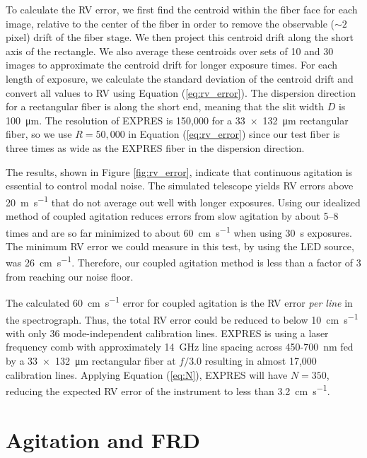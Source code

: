 To calculate the RV error, we first find the centroid within the fiber face for each image, relative to the center of the fiber in order to remove the observable ($\sim 2$ pixel) drift of the fiber stage. We then project this centroid drift along the short axis of the rectangle. We also average these centroids over sets of 10 and 30 images to approximate the centroid drift for longer exposure times. For each length of exposure, we calculate the standard deviation of the centroid drift and convert all values to RV using Equation (\ref{eq:rv_error}). The dispersion direction for a rectangular fiber is along the short end, meaning that the slit width $D$ is \SI{100}{\micro\meter}. The resolution of EXPRES is 150,000 for a \SI{33x132}{\micro\meter} rectangular fiber, so we use $R=50,000$ in Equation (\ref{eq:rv_error}) since our test fiber is three times as wide as the EXPRES fiber in the dispersion direction.

The results, shown in Figure \ref{fig:rv_error}, indicate that continuous agitation is essential to control modal noise. The simulated telescope yields RV errors above \SI{20}{\meter\per\second} that do not average out well with longer exposures. Using our idealized method of coupled agitation reduces errors from slow agitation by about 5--8 times and are so far minimized to about \SI{60}{\centi\meter\per\second} when using \SI{30}{\second} exposures. The minimum RV error we could measure in this test, by using the LED source, was \SI{26}{\centi\meter\per\second}. Therefore, our coupled agitation method is less than a factor of 3 from reaching our noise floor.

The calculated \SI{60}{\centi\meter\per\second} error for coupled agitation is the RV error \textit{per line} in the spectrograph. Thus, the total RV error could be reduced to below \SI{10}{\centi\meter\per\second} with only 36 mode-independent calibration lines. EXPRES is using a laser frequency comb with approximately {\SI{14}{\giga\hertz}} line spacing across 450-{\SI{700}{\nano\meter}} fed by a {\SI{33x132}{\micro\meter}} rectangular fiber at $f/3.0$ resulting in almost 17,000 calibration lines. Applying Equation (\ref{eq:N}), EXPRES will have $N=350$, reducing the expected RV error of the instrument to less than {\SI{3.2}{\centi\meter\per\second}}.

\section{Agitation and FRD}
\label{modal-noise:frd}

